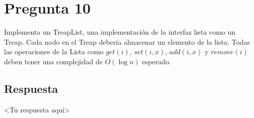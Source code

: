 \section*{Pregunta 10}

\noindent Implementa un TreapList, una implementación de la interfaz lista como un Treap. Cada nodo en el Treap debería almacenar un elemento de la lista. Todas las operaciones de la Lista como $get(i)$, $set(i,x)$, $add(i, x)$ y $remove(i)$ deben tener una complejidad de $O(\log n)$ esperado.


\subsection*{Respuesta}

<Tu respuesta aquí>

\bigskip
